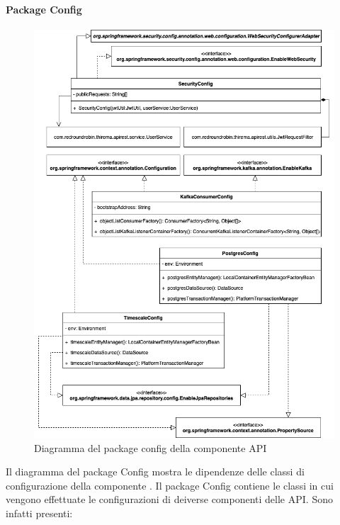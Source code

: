 		\newpage
		\paragraph*{Package Config} 
		\begin{figure}[H]
			\centering
			\includegraphics[scale=0.550]{res/images/API/ConfigPackage.png}
			\caption{Diagramma del package config della componente API}
			\label{Diagramma 12}
		\end{figure}
		\newpage
		Il diagramma del package Config mostra le dipendenze delle classi di configurazione della componente .
		\newline
		Il package Config contiene le classi in cui vengono effettuate le configurazioni di deiverse componenti delle API. Sono infatti presenti:
